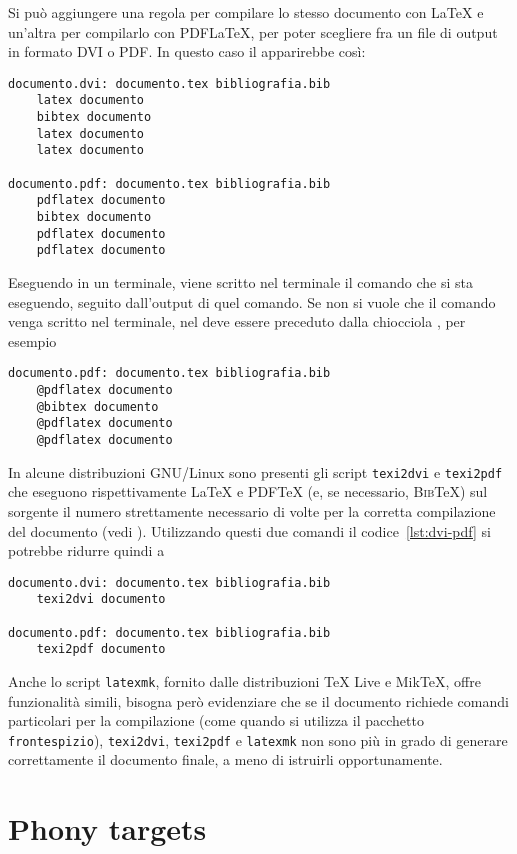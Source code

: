 Si può aggiungere una regola per compilare lo stesso documento con \LaTeX{}
e un'altra per compilarlo con \textsc{PDF}\LaTeX, per poter scegliere fra un
file di output in formato \textsc{DVI} o \textsc{PDF}.  In questo caso il
 apparirebbe così:
\begin{lstlisting}[caption={La prima regola permette di compilare un documento
con \LaTeX, la seconda con \textsc{PDF}\LaTeX.},label=lst:dvi-pdf]
documento.dvi: documento.tex bibliografia.bib
	latex documento
	bibtex documento
	latex documento
	latex documento

documento.pdf: documento.tex bibliografia.bib
	pdflatex documento
	bibtex documento
	pdflatex documento
	pdflatex documento
\end{lstlisting}

Eseguendo  in un terminale, viene scritto nel terminale il
comando che si sta eseguendo, seguito dall'output di quel comando.  Se non si
vuole che il comando venga scritto nel terminale, nel  deve
essere preceduto dalla chiocciola \texttt{\@}, per esempio
\begin{lstlisting}
documento.pdf: documento.tex bibliografia.bib
	@pdflatex documento
	@bibtex documento
	@pdflatex documento
	@pdflatex documento
\end{lstlisting}

In alcune distribuzioni GNU/Linux sono presenti gli script \texttt{texi2dvi} e
\texttt{texi2pdf} che eseguono rispettivamente \LaTeX{}
e \textsc{PDF}\TeX{}
(e, se necessario, \textsc{Bib}\TeX) sul sorgente il numero strettamente
necessario di volte per la corretta compilazione del documento (vedi
\cite[pagina 63]{caucci:tabelle}).  Utilizzando questi due comandi il
codice~\ref{lst:dvi-pdf} si potrebbe ridurre quindi a
\begin{lstlisting}
documento.dvi: documento.tex bibliografia.bib
	texi2dvi documento

documento.pdf: documento.tex bibliografia.bib
	texi2pdf documento
\end{lstlisting}
Anche lo script \texttt{latexmk}, fornito dalle distribuzioni TeX Live e MikTeX,
offre funzionalità simili, bisogna però evidenziare che se il documento richiede
comandi particolari per la compilazione (come quando si utilizza il pacchetto
\texttt{frontespizio}), \texttt{texi2dvi}, \texttt{texi2pdf} e \texttt{latexmk}
non sono più in grado di generare correttamente il documento finale, a meno di
istruirli opportunamente.

\section{Phony targets}
\label{sec:phony}

